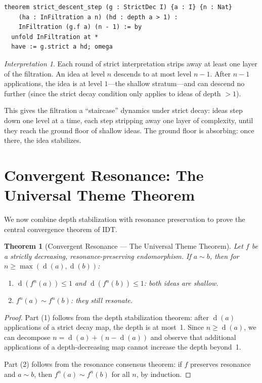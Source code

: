 \documentclass[11pt,openany]{book}
\theoremstyle{definition}
\theoremstyle{plain}
\newtheorem{theorem}[axiom]{Theorem}
\theoremstyle{remark}
\newtheorem{interpretation}[axiom]{Interpretation}
\newcommand{\res}{\sim}                      %
\newcommand{\depth}{\operatorname{d}}       %
\begin{document}
\begin{lstlisting}[language=Lean4]
theorem strict_descent_step (g : StrictDec I) {a : I} {n : Nat}
    (ha : InFiltration a n) (hd : depth a > 1) :
    InFiltration (g.f a) (n - 1) := by
  unfold InFiltration at *
  have := g.strict a hd; omega
\end{lstlisting}

\begin{interpretation}
Each round of strict interpretation strips away at least one layer of the filtration. An idea at level $n$ descends to at most level $n - 1$. After $n - 1$ applications, the idea is at level $1$---the shallow stratum---and can descend no further (since the strict decay condition only applies to ideas of depth $> 1$).

This gives the filtration a ``staircase'' dynamics under strict decay: ideas step down one level at a time, each step stripping away one layer of complexity, until they reach the ground floor of shallow ideas. The ground floor is absorbing: once there, the idea stabilizes.
\end{interpretation}

\section{Convergent Resonance: The Universal Theme Theorem}

We now combine depth stabilization with resonance preservation to prove the central convergence theorem of IDT.

\begin{theorem}[Convergent Resonance --- The Universal Theme Theorem]
\label{thm:convergent-resonance}
Let $f$ be a strictly decreasing, resonance-preserving endomorphism. If $a \res b$, then for $n \geq \max(\depth(a), \depth(b))$:
\begin{enumerate}
\item $\depth(f^n(a)) \leq 1$ and $\depth(f^n(b)) \leq 1$: both ideas are shallow.
\item $f^n(a) \res f^n(b)$: they still resonate.
\end{enumerate}
\end{theorem}

\begin{proof}
Part (1) follows from the depth stabilization theorem: after $\depth(a)$ applications of a strict decay map, the depth is at most~1. Since $n \geq \depth(a)$, we can decompose $n = \depth(a) + (n - \depth(a))$ and observe that additional applications of a depth-decreasing map cannot increase the depth beyond~1.

Part (2) follows from the resonance consensus theorem: if $f$ preserves resonance and $a \res b$, then $f^n(a) \res f^n(b)$ for all $n$, by induction.
\end{proof}
\end{document}
